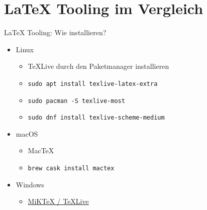 \documentclass[main.tex]{subfiles}
\begin{document}
\section{\LaTeX{} Tooling im Vergleich}


\begin{frame}{\LaTeX{} Tooling: Wie installieren?}
    \begin{itemize}
        \item Linux
        \begin{itemize}
            \item \TeX{}Live durch den Paketmanager installieren
            \item \texttt{sudo apt install texlive-latex-extra}
            \item \texttt{sudo pacman -S texlive-most}
            \item \texttt{sudo dnf install texlive-scheme-medium}
        \end{itemize}
        \pause
        \medskip
        \item macOS
        \begin{itemize}
            \item MacTeX
            \item \texttt{brew cask install mactex}
        \end{itemize}
        \pause
        \medskip
        \item Windows
        \begin{itemize}
            \item \href{https://tex.stackexchange.com/questions/20036/what-are-the-advantages-of-tex-live-over-miktex}{MiK\TeX{} / \TeX{}Live}
        \end{itemize}
    \end{itemize}
\end{frame}
\end{document}
